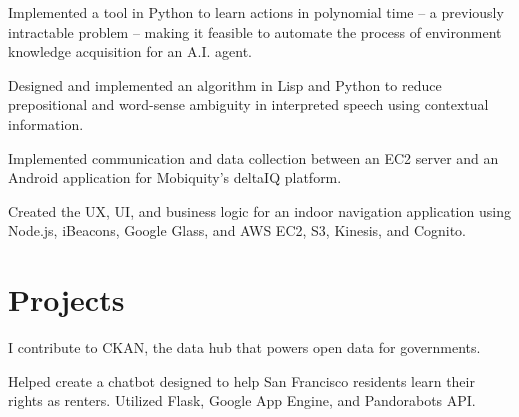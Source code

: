 \documentclass[]{deedy-resume-openfont}
\begin{document}
\begin{minipage}[t]{0.66\textwidth}
\begin{tightemize}
\item Implemented a tool in Python to learn actions in polynomial time -- a previously intractable problem -- making it feasible to automate the process of environment knowledge acquisition for an A.I. agent.

\item Designed and implemented an algorithm in Lisp and Python to reduce prepositional and word-sense ambiguity in interpreted speech using contextual information.
\end{tightemize}
\sectionsep

\begin{tightemize}
\item Implemented communication and data collection between an EC2 server and an Android application for Mobiquity’s deltaIQ platform.

\item Created the UX, UI, and business logic for an indoor navigation application using Node.js, iBeacons, Google Glass, and AWS EC2, S3, Kinesis, and Cognito.
\end{tightemize}


\section{Projects}

\begin{tightemize}
\item I contribute to CKAN, the data hub that powers open data for governments.
\end{tightemize}
\sectionsep

\begin{tightemize}
\item Helped create a chatbot designed to help San Francisco residents learn their rights as renters. Utilized Flask, Google App Engine, and Pandorabots API.
\end{tightemize}
\sectionsep


\end{minipage}
\end{document}
